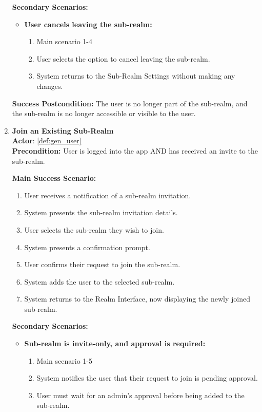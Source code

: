 \documentclass{article}
\begin{document}
\begin{enumerate}[label=\textbf{UC\arabic*}]
        \textbf{Secondary Scenarios:}
        \begin{itemize}
            \item[{}] \textbf{User cancels leaving the sub-realm:}
            \begin{enumerate}[label=\textbf{\arabic*.}]
                \item Main scenario 1-4
                \item User selects the option to cancel leaving the sub-realm.
                \item System returns to the Sub-Realm Settings without making any changes.
            \end{enumerate}
        \end{itemize}
        
        \textbf{Success Postcondition:} The user is no longer part of the sub-realm, and the sub-realm is no longer accessible or visible to the user.

    \item \label{uc:19} \textbf{Join an Existing Sub-Realm} \\
        \textbf{Actor}: \ref{def:gen_user} \\
        \textbf{Precondition:} User is logged into the app AND has received an invite to the sub-realm.
    
        \textbf{Main Success Scenario:}
        \begin{enumerate}[label=\textbf{\arabic*.}]
            \item User receives a notification of a sub-realm invitation.
            \item System presents the sub-realm invitation details.
            \item User selects the sub-realm they wish to join.
            \item System presents a confirmation prompt.
            \item User confirms their request to join the sub-realm.
            \item System adds the user to the selected sub-realm.
            \item System returns to the Realm Interface, now displaying the newly joined sub-realm.
        \end{enumerate}
        
        \textbf{Secondary Scenarios:}
        \begin{itemize}
            \item[{}] \textbf{Sub-realm is invite-only, and approval is required:}
            \begin{enumerate}[label=\textbf{\arabic*.}]
                \item Main scenario 1-5
                \item System notifies the user that their request to join is pending approval.
                \item User must wait for an admin’s approval before being added to the sub-realm.
            \end{enumerate}
            

\end{itemize}
\end{enumerate}
\end{document}
